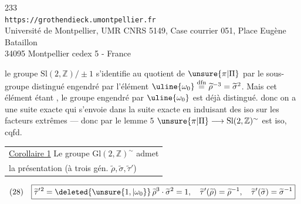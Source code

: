 
\begin{center}
233\\
\texttt{https://grothendieck.umontpellier.fr}\\
Université de Montpellier, UMR CNRS 5149, Case courrier 051, Place Eugène Bataillon\\
34095 Montpellier cedex 5 - France
\end{center}


le groupe $\mathrm{Sl}(2,\mathbb Z)/\pm1$ s'identifie au quotient de $\unsure{\pi|\Pi}$ par le sous-groupe distingué engendré par l'élément $\uline{\omega_0}\overset{\mathrm{dfn}}{=}\widetilde\rho^{-3}=\widetilde\sigma^2$.
Mais cet élément étant , le groupe engendré par $\uline{\omega_0}$ est déjà distingué.
donc on a une suite exacte
qui s'envoie dans la suite exacte
en induisant des iso  sur les facteurs extrêmes --- donc par le lemme  $5$
$\unsure{\pi|\Pi}\longrightarrow\mathrm{Sl}(2,\mathbb Z)^{\sim}$ est iso, cqfd.

\begin{tabular}{|l}
\uline{Corollaire 1} Le groupe $\mathrm{Gl}(2,\mathbb Z)^{\sim}$ admet\\
la présentation (à trois gén. $\widetilde\rho,\widetilde\sigma,\widetilde\tau'$)
\end{tabular}
\[
\begin{array}{ll}
(28)&\boxed{
\widetilde\tau'{}^{2}=\deleted{\unsure{1,|\omega_0}}\,
\widetilde\rho^3\cdot\widetilde\sigma^2=1,\quad
\widetilde\tau'(\widetilde\rho)=\widetilde\rho^{-1},\quad
\widetilde\tau'(\widetilde\sigma)=\widetilde\sigma^{-1}}
\end{array}
\]

